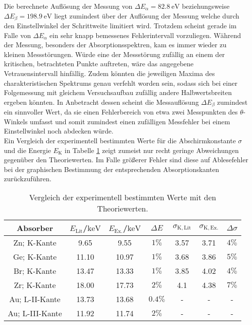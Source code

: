 Die berechnete Auflösung der Messung von ${\Delta E_{\alpha}=\SI{82.8}{\electronvolt}}$
beziehungsweise ${\Delta E_{\beta}=\SI{198.9}{\electronvolt}}$ liegt zumindest über der Auflösung der Messung welche durch den Einstellwinkel der Schrittweite limitiert wird.
Trotzdem scheint gerade im Falle von $\Delta E_\alpha$ ein sehr knapp bemessenes Fehlerintervall vorzuliegen.
Während der Messung, besonders der Absorptionsspektren, kam es immer wieder zu kleinen Messstörungen. Würde eine der Messstörung zufällig an einem der kritischen, betrachteten Punkte auftreten, wäre das angegebene Vetrauensintervall hinfällig. Zudem könnten die jeweiligen Maxima des charakteristischen Spektrums genau verfehlt worden sein, sodass sich bei einer Folgemessung mit gleichem Versuchsaufbau zufällig andere Halbwertsbreiten ergeben könnten.
In Anbetracht dessen scheint die Messauflösung $\Delta E_{\beta}$ zumindest ein sinnvoller Wert, da sie einen Fehlerbereich von etwa zwei Messpunkten des $\theta$-Winkels umfasst und somit zumindest einen zufälligen Messfehler bei einem Einstellwinkel noch abdecken würde.\\
Ein Vergleich der experimentell bestimmten Werte für die Abschirmkonstante $\sigma$ und die Energie $E_\mathrm{K}$ in Tabelle \ref{tab:theo} zeigt zumeist nur recht geringe Abweichungen gegenüber den Theoriewerten.
Im Falle größerer Fehler sind diese auf Ablesefehler bei der graphischen Bestimmung der entsprechenden Absorptionskanten zurückzuführen.
\begin{table}
	\caption{Vergleich der experimentell bestimmten Werte mit den Theoriewerten.}
	\label{tab:theo}
	\centering
\begin{tabular}{ccccccc}
\toprule
Absorber & $E_\mathrm{Lit}$/$\si{\kilo\electronvolt}$& $E_\mathrm{Ex.}$/$\si{\kilo\electronvolt}$&$\Delta E$ &$\sigma_\mathrm{K,Lit}$ &$\sigma_\mathrm{K,Ex.}$&$\Delta \sigma$ \\
\midrule
Zn; K-Kante & 9.65     & 9.55 &$1\%$& 3.57       &  3.71         &$   4\%$ \\
Ge; K-Kante & 11.10    & 10.97 & $1\%$&      3.68       & 3.86    &$   5\%$  \\
Br; K-Kante & 13.47    & 13.33 & $1\%$&      3.85       & 4.02    &$   4\%$  \\
Zr; K-Kante & 18.00    & 17.73 & $2\%$&      4.1        &4.38     &$   7\%$  \\
Au; L-II-Kante& 13.73  & 13.68 & $0.4\%$&      -      &  -  & - \\
Au; L-III-Kante& 11.92 &  11.74& $2\%$&      -     &  -  & - \\
\bottomrule
\end{tabular}
\end{table}

